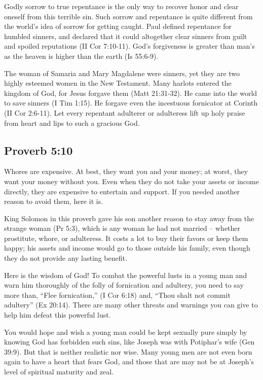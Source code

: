 Godly sorrow to true repentance is the only way to recover honor and clear oneself from this terrible sin. Such sorrow and repentance is quite different from the world’s idea of sorrow for getting caught. Paul defined repentance for humbled sinners, and declared that it could altogether clear sinners from guilt and spoiled reputations (II Cor 7:10-11). God’s forgiveness is greater than man’s as the heaven is higher than the earth (Is 55:6-9).

The woman of Samaria and Mary Magdalene were sinners, yet they are two highly esteemed women in the New Testament. Many harlots entered the kingdom of God, for Jesus forgave them (Matt 21:31-32). He came into the world to save sinners (I Tim 1:15). He forgave even the incestuous fornicator at Corinth (II Cor 2:6-11). Let every repentant adulterer or adulteress lift up holy praise from heart and lips to such a gracious God.

\subsection{Proverb 5:10}
Whores are expensive. At best, they want you and your money; at worst, they want your money without you. Even when they do not take your assets or income directly, they are expensive to entertain and support. If you needed another reason to avoid them, here it is.

King Solomon in this proverb gave his son another reason to stay away from the strange woman (Pr 5:3), which is any woman he had not married – whether prostitute, whore, or adulteress. It costs a lot to buy their favors or keep them happy; his assets and income would go to those outside his family, even though they do not provide any lasting benefit.

Here is the wisdom of God! To combat the powerful lusts in a young man and warn him thoroughly of the folly of fornication and adultery, you need to say more than, “Flee fornication,” (I Cor 6:18) and, “Thou shalt not commit adultery” (Ex 20:14). There are many other threats and warnings you can give to help him defeat this powerful lust.

You would hope and wish a young man could be kept sexually pure simply by knowing God has forbidden such sins, like Joseph was with Potiphar’s wife (Gen 39:9). But that is neither realistic nor wise. Many young men are not even born again to have a heart that fears God, and those that are may not be at Joseph’s level of spiritual maturity and zeal.

